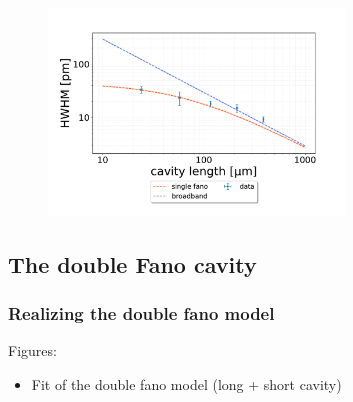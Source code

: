 \begin{figure}[h!]
    \centering
    \includegraphics[width=0.7\textwidth]{figures/results/HWHM_vs_cavity_length_single_fano.pdf}
    \caption{}
    \label{fig:HWHM_vs_time_single_fano_data}
\end{figure}

\subsection{The double Fano cavity}

\subsubsection{Realizing the double fano model}

Figures: 
\begin{itemize}
    \item Fit of the double fano model (long + short cavity)
\end{itemize}

